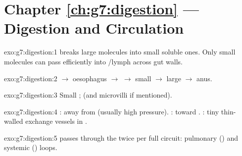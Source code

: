 \section*{Chapter \ref{ch:g7:digestion} --- Digestion and Circulation}

\begin{solution}{exo:g7:digestion:1}
 breaks large  molecules into small soluble ones. Only small
molecules can pass efficiently into /lymph across gut walls.
\end{solution}

\begin{solution}{exo:g7:digestion:2}
 $\to$ oesophagus $\to$  $\to$ small  $\to$ large
 $\to$ anus.
\end{solution}

\begin{solution}{exo:g7:digestion:3}
Small ;  (and microvilli if mentioned).
\end{solution}

\begin{solution}{exo:g7:digestion:4}
: away from  (usually high pressure). : toward .
: tiny thin-walled exchange vessels in .
\end{solution}

\begin{solution}{exo:g7:digestion:5}
 passes through the  twice per full  circuit: pulmonary
() and systemic () loops.
\end{solution}

